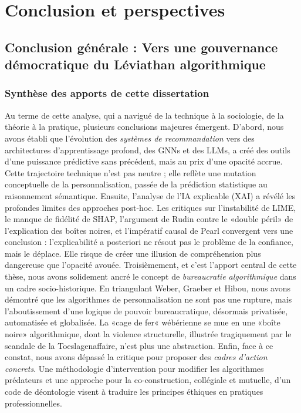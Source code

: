 \part{Conclusion et perspectives}
\chapter{Conclusion générale : Vers une gouvernance démocratique du Léviathan algorithmique}
\label{chap:conclusion}

\section{Synthèse des apports de cette dissertation}
Au terme de cette analyse, qui a navigué de la technique à la sociologie, de la théorie à la pratique, plusieurs conclusions majeures émergent.
D'abord, nous avons établi que l'évolution des \textit{systèmes de recommandation} vers des architectures d'apprentissage profond, des GNNs et des LLMs, a créé des outils d'une puissance prédictive sans précédent, mais au prix d'une opacité accrue. Cette trajectoire technique n'est pas neutre ; elle reflète une mutation conceptuelle de la personnalisation, passée de la prédiction statistique au raisonnement sémantique.
Ensuite, l'analyse de l'IA explicable (XAI) a révélé les profondes limites des approches post-hoc. Les critiques sur l'instabilité de LIME, le manque de fidélité de SHAP, l'argument de Rudin contre le «double péril» de l'explication des boîtes noires, et l'impératif causal de Pearl convergent vers une conclusion : l'explicabilité a posteriori ne résout pas le problème de la confiance, mais le déplace. Elle risque de créer une illusion de compréhension plus dangereuse que l'opacité avouée.
Troisièmement, et c'est l'apport central de cette thèse, nous avons solidement ancré le concept de \textit{bureaucratie algorithmique} dans un cadre socio-historique. En triangulant Weber, Graeber et Hibou, nous avons démontré que les algorithmes de personnalisation ne sont pas une rupture, mais l'aboutissement d'une logique de pouvoir bureaucratique, désormais privatisée, automatisée et globalisée. La «cage de fer« wébérienne se mue en une «boîte noire» algorithmique, dont la violence structurelle, illustrée tragiquement par le scandale de la Toeslagenaffaire, n'est plus une abstraction.
Enfin, face à ce constat, nous avons dépassé la critique pour proposer des \textit{cadres d'action concrets}. Une méthodologie d'intervention pour modifier les algorithmes prédateurs et une approche pour la co-construction, collégiale et mutuelle, d'un code de déontologie visent à traduire les principes éthiques en pratiques professionnelles.
\vspace{4em}
